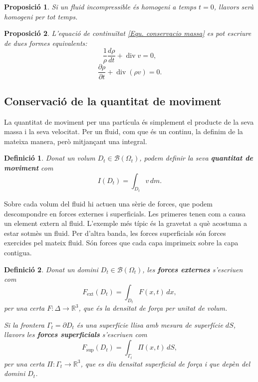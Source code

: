 \documentclass{article}
\numberwithin{equation}{section}
\DeclareMathOperator{\diver}{div}
\newtheorem{definicio}{Definici\'{o}}[section]
\newtheorem{proposicio}{Proposici\'{o}}[section]
\begin{document}
\begin{proposicio}\label{Pro: homogeni inicial}
Si un fluid incompressible \'{e}s homogeni a temps $t=0$, llavors ser\`{a} homogeni per tot temps.
\end{proposicio}

\begin{proposicio}\label{Pro: conservacio massa final}
L'equaci\'{o} de continu\"{i}tat \ref{Equ. conservacio massa} es pot escriure de dues formes equivalents:
\begin{equation}
\frac{1}{\rho}\frac{d\rho}{dt}+\diver v=0,
\end{equation}
\begin{equation}
\frac{\partial\rho}{\partial t}+\diver(\rho v)=0.
\end{equation}
\end{proposicio}

\subsection{Conservaci\'{o} de la quantitat de moviment}
La quantitat de moviment per una part\'{i}cula \'{e}s simplement el producte de la seva massa i la seva velocitat. Per un fluid, com que \'{e}s un continu, la definim de la mateixa manera, per\`{o} mitjan\c{c}ant una integral.

\begin{definicio}\label{Def: quantitat moviment}
Donat un volum $D_t\in\mathcal{B}(\Omega_t)$, podem definir la seva \textbf{quantitat de moviment} com
\begin{equation}
I(D_t)=\int_{D_t}v\,dm.
\end{equation}
\end{definicio}

Sobre cada volum del fluid hi actuen una s\`{e}rie de forces, que podem descompondre en forces externes i superficials. Les primeres tenen com a causa un element extern al fluid. L'exemple m\'{e}s t\'{i}pic \'{e}s la gravetat a qu\`{e} acostuma a estar sotm\`{e}s un fluid. Per d'altra banda, les forces superficials s\'{o}n forces exercides pel mateix fluid. S\'{o}n forces que cada capa imprimeix sobre la capa contigua.

\begin{definicio}\label{Def: forces}
Donat un domini $D_t\in\mathcal{B}(\Omega_t)$, les \textbf{forces externes} s'escriuen com
\[F_{\text{ext}}(D_t)=\int_{D_t}F(x,t)\,dx,\]
per una certa $F:\Delta\rightarrow\mathbb{R}^3$, que \'{e}s la densitat de for\c{c}a per unitat de volum.

Si la frontera $\Gamma_t=\partial D_t$ \'{e}s una superf\'{i}cie llisa amb mesura de superf\'{i}cie $dS$, llavors les \textbf{forces superficials} s'escriuen com
\[F_{\text{sup}}(D_t)=\int_{\Gamma_t}\Pi(x,t)\,dS,\]
per una certa $\Pi:\Gamma_t\rightarrow\mathbb{R}^3$, que es diu densitat superficial de for\c{c}a i que dep\`{e}n del domini $D_t$.
\end{definicio}
\end{document}
